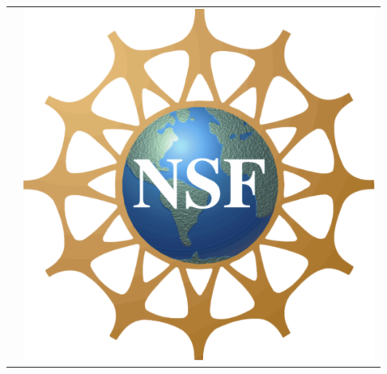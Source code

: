 \documentclass[final]{beamer}
\begin{document}
\begin{frame}[t]
\begin{columns}
\begin{column}{0.3\paperwidth}
\begin{tabular}{cc}
& 
\begin{minipage}{2.5in}
\includegraphics[scale=.25]{NSF_logo.png}
\end{minipage}
\end{tabular}
	
		\end{column}
		
		
		\begin{column}{0.3\paperwidth}
		\end{column}
		
		\begin{column}{0.3\paperwidth}


\end{column}
\end{columns}
\end{frame}
\end{document}
